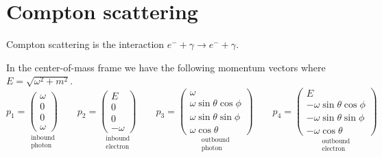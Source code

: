 

\section*{Compton scattering}

Compton scattering is the interaction $e^-+\gamma\rightarrow e^-+\gamma$.

\begin{center}
\end{center}

In the center-of-mass frame we have the following momentum vectors where $E=\sqrt{\omega^2+m^2}$.
\begin{equation*}
p_1=\underset{\substack{\text{inbound}\\ \text{photon}}}
{\begin{pmatrix}\omega\\0\\0\\ \omega\end{pmatrix}}
\qquad
p_2=\underset{\substack{\text{inbound}\\ \text{electron}}}
{\begin{pmatrix}E\\0\\0\\-\omega\end{pmatrix}}
\qquad
p_3=\underset{\substack{\text{outbound}\\ \text{photon}}}
{\begin{pmatrix}
\omega\\
\omega\sin\theta\cos\phi\\
\omega\sin\theta\sin\phi\\
\omega\cos\theta
\end{pmatrix}}
\qquad
p_4=\underset{\substack{\text{outbound}\\ \text{electron}}}
{\begin{pmatrix}
E\\
-\omega\sin\theta\cos\phi\\
-\omega\sin\theta\sin\phi\\
-\omega\cos\theta
\end{pmatrix}}
\end{equation*}

